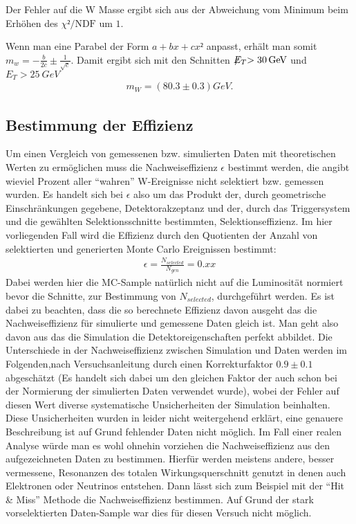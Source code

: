 \documentclass[a4paper,12pt]{article}
\newcommand{\met}{\ensuremath{\not\mathrel{E}}_T}
\begin{document}
Der Fehler auf die W Masse ergibt sich aus der Abweichung vom Minimum beim Erhöhen des
$χ²/\text{NDF}$ um $1$.

Wenn man eine Parabel der Form $a + bx + cx²$ anpasst, erhält man somit $m_w = -\frac{b}{2c} ±
\frac{1}{\sqrt{c}}$.
Damit ergibt sich mit den Schnitten $\met > \SI{30}{GeV}$ und $E_{T} > \SI{25}{GeV}$
\begin{align*}
	m_W =  ( 80.3 ± 0.3 ) \si{GeV}.
\end{align*}


\subsection{Bestimmung der Effizienz}
\label{effizienz}
Um einen Vergleich von gemessenen bzw. simulierten Daten mit theoretischen Werten zu ermöglichen muss die Nachweiseffizienz
$\epsilon$ bestimmt werden, die angibt wieviel Prozent aller "`wahren"' W-Ereignisse nicht selektiert bzw. gemessen wurden.
Es handelt sich bei $\epsilon$ also um das Produkt der, durch geometrische Einschränkungen gegebene, Detektorakzeptanz und der,
durch das Triggersystem und die gewählten Selektionsschnitte bestimmten, Selektionseffizienz. Im hier vorliegenden Fall wird die
Effizienz durch den Quotienten der Anzahl von selektierten und generierten Monte Carlo Ereignissen bestimmt:
\begin{align*}
	\epsilon = \frac{N_{selected}}{N_{gen}} = 0.xx
\end{align*}
Dabei werden hier die MC-Sample natürlich nicht auf die Luminosität normiert bevor die Schnitte, zur Bestimmung von $N_{selected}$, durchgeführt
werden.
Es ist dabei zu beachten, dass die so berechnete Effizienz davon ausgeht das die Nachweiseffizienz für simulierte und gemessene
Daten gleich ist. Man geht also davon aus das die Simulation die Detektoreigenschaften perfekt abbildet. Die Unterschiede in der
Nachweiseffizienz zwischen Simulation und Daten werden im Folgenden,nach Versuchsanleitung \cite{versuchsanleitung} durch einen
Korrekturfaktor $0.9\pm0.1$ abgeschätzt (Es handelt sich dabei um den gleichen Faktor der auch schon bei der Normierung der simulierten Daten
verwendet wurde), wobei der Fehler auf diesen Wert diverse systematische Unsicherheiten der Simulation
beinhalten. Diese Unsicherheiten wurden in \cite{versuchsanleitung} leider nicht weitergehend erklärt, eine genauere Beschreibung
ist auf Grund fehlender Daten nicht möglich. Im Fall einer realen Analyse würde man es wohl ohnehin vorziehen die Nachweiseffizienz aus
den aufgezeichneten Daten zu bestimmen. Hierfür werden meistens andere, besser vermessene, Resonanzen des totalen Wirkungsquerschnitt genutzt
in denen auch Elektronen oder Neutrinos entstehen. Dann lässt sich zum Beispiel mit der "`Hit \&
Miss"' Methode die Nachweiseffizienz bestimmen. Auf Grund
der stark vorselektierten Daten-Sample war dies für diesen Versuch nicht möglich.
\end{document}
